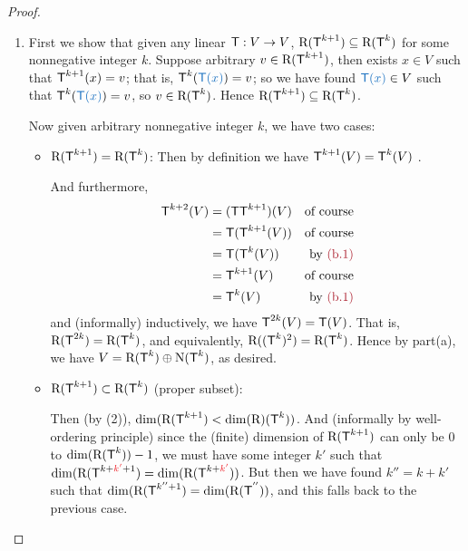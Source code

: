 \begin{proof}
\begin{enumerate}
\item
First we show that given any linear \(\textsf{T} : V \to V\), \(\mathrm{R}(\textsf{T}^{k + 1}) \subseteq \mathrm{R}(\textsf{T}^k)\) for some nonnegative integer \(k\).
Suppose arbitrary \(v \in \mathrm{R}(\textsf{T}^{k + 1})\), then exists \(x \in V\) such that \(\textsf{T}^{k + 1}(x) = v\);
that is, \(\T^k(\BLUE{\T(x)}) = v\);
so we have found \(\BLUE{\T(x)} \in V\) such that \(\T^k(\BLUE{\T(x)}) = v\), so \(v \in \mathrm{R}(\textsf{T}^k)\).
Hence \(\mathrm{R}(\textsf{T}^{k + 1}) \subseteq \mathrm{R}(\textsf{T}^k)\).

Now given arbitrary nonnegative integer \(k\), we have two cases:
\begin{itemize}
    \item \(\mathrm{R}(\textsf{T}^{k + 1}) = \mathrm{R}(\textsf{T}^k)\): Then by definition we have \(\textsf{T}^{k + 1}(V) = \textsf{T}^k(V)\) .
    
    And furthermore,
    \begin{align*}
        \T^{k + 2}(V) & = (\T \T^{k+1})(V) & \text{of course} \\
                      & = \T(\T^{k + 1}(V)) & \text{of course} \\
                      & = \T(\T^k(V)) & \text{by \MAROON{(b.1)}} \\
                      & = \T^{k + 1}(V) & \text{of course} \\
                      & = \T^k(V) & \text{by \MAROON{(b.1)}}
    \end{align*}
    and (informally) inductively, we have \(\textsf{T}^{2k}(V) = \textsf{T}(V)\).
    That is, \(\mathrm{R}(\textsf{T}^{2k}) = \mathrm{R}(\textsf{T}^k)\), and equivalently, \(\mathrm{R}((\textsf{T}^k)^2) = \mathrm{R}(\textsf{T}^k)\).
    Hence by part(a), we have \(V = \mathrm{R}(\textsf{T}^k) \oplus \mathrm{N}(\textsf{T}^k)\), as desired.
    
    \item \(\mathrm{R}(\textsf{T}^{k + 1}) \subset \mathrm{R}(\textsf{T}^k)\) (proper subset):

    Then (by (2)), \(\dim(\mathrm{R}(\textsf{T}^{k + 1}) < \dim(\mathrm{R})(\textsf{T}^k))\).
    And (informally by well-ordering principle) since the (finite) dimension of \(\mathrm{R}(\textsf{T}^{k + 1})\) can only be \(0\) to \(\dim(\mathrm{R}(\textsf{T}^k)) - 1\), we must have some integer \(k'\) such that \(\dim(\RANGE(\T^{k + \RED{k'} + 1}) = \dim(\RANGE(\T^{k + \RED{k'}}))\).
    But then we have found \(k'' = k + k'\) such that \(\dim(\mathrm{R}(\textsf{T}^{k'' + 1}) = \dim(\mathrm{R}(\textsf{T}^{''}))\), and this falls back to the previous case.
\end{itemize}
\end{enumerate}
\end{proof}

